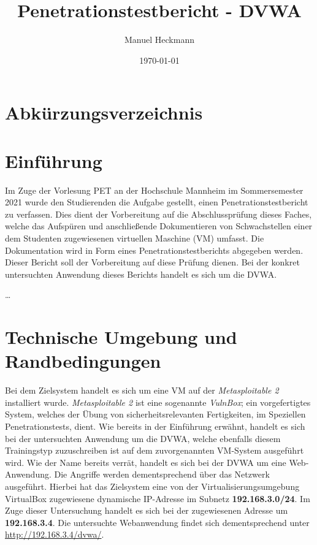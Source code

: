 \documentclass[a4paper, 12pt]{report}
\title{Penetrationstestbericht - \ac{DVWA}}
\author{Manuel Heckmann}
\date{\today}
\begin{document}
\maketitle
\tableofcontents
\listoffigures

\chapter*{Abkürzungsverzeichnis}
\begin{acronym}
\end{acronym}

\chapter{Einführung}
Im Zuge der Vorlesung \ac{PET} an der Hochschule Mannheim im Sommersemester 2021
wurde den Studierenden die Aufgabe gestellt, einen Penetrationstestbericht zu verfassen.
Dies dient der Vorbereitung auf die Abschlussprüfung dieses Faches,
welche das Aufspüren und anschließende Dokumentieren von Schwachstellen einer
dem Studenten zugewiesenen virtuellen Maschine (\acs{VM}) umfasst.
Die Dokumentation wird in Form eines Penetrationstestberichts abgegeben werden.
Dieser Bericht soll der Vorbereitung auf diese Prüfung dienen.
Bei der konkret untersuchten Anwendung dieses Berichts handelt es sich um die \ac{DVWA}.

\ldots

\chapter{Technische Umgebung und Randbedingungen}
Bei dem Zielsystem handelt es sich um eine \ac{VM} auf der \emph{Metasploitable 2} installiert wurde.
\emph{Metasploitable 2} ist eine sogenannte \emph{VulnBox}; ein vorgefertigtes System, welches der Übung
von sicherheitsrelevanten Fertigkeiten, im Speziellen Penetrationstests, dient.
Wie bereits in der Einführung erwähnt, handelt es sich bei der untersuchten Anwendung um die \ac{DVWA},
welche ebenfalls diesem Trainingstyp zuzuschreiben ist auf dem zuvorgenannten \ac{VM}-System ausgeführt wird.
Wie der Name bereits verrät, handelt es sich bei der \ac{DVWA} um eine Web-Anwendung.
Die Angriffe werden dementsprechend über das Netzwerk ausgeführt.
Hierbei hat das Zielsystem eine von der Virtualisierungsumgebung VirtualBox zugewiesene dynamische IP-Adresse
im Subnetz \textbf{192.168.3.0/24}.
Im Zuge dieser Untersuchung handelt es sich bei der zugewiesenen Adresse um \textbf{192.168.3.4}.
Die untersuchte Webanwendung findet sich dementsprechend unter \url{http://192.168.3.4/dvwa/}.
\end{document}
